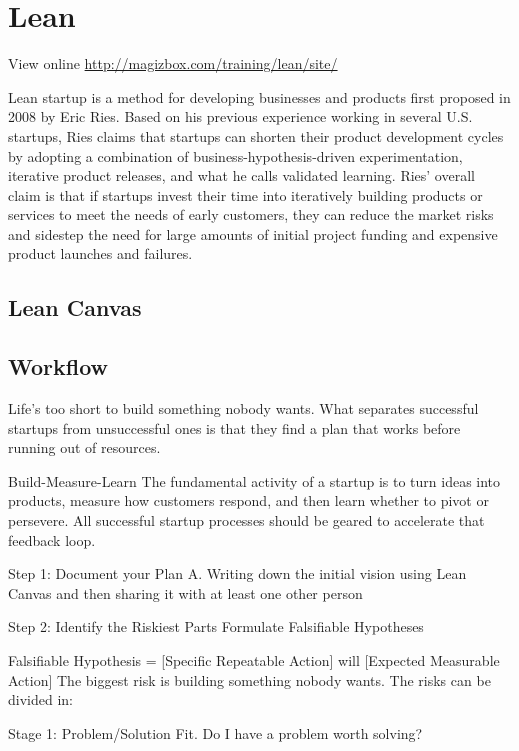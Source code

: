 \chapter{Lean}

View online \href{http://magizbox.com/training/lean/site/}{http://magizbox.com/training/lean/site/}

Lean startup is a method for developing businesses and products first proposed in 2008 by Eric Ries. Based on his previous experience working in several U.S. startups, Ries claims that startups can shorten their product development cycles by adopting a combination of business-hypothesis-driven experimentation, iterative product releases, and what he calls validated learning. Ries' overall claim is that if startups invest their time into iteratively building products or services to meet the needs of early customers, they can reduce the market risks and sidestep the need for large amounts of initial project funding and expensive product launches and failures.

\section{Lean Canvas}

\section{Workflow}

Life’s too short to build something nobody wants. What separates successful startups from unsuccessful ones is that they find a plan that works before running out of resources.

Build-Measure-Learn
The fundamental activity of a startup is to turn ideas into products, measure how customers respond, and then learn whether to pivot or persevere. All successful startup processes should be geared to accelerate that feedback loop.



Step 1: Document your Plan A.
Writing down the initial vision using Lean Canvas and then sharing it with at least one other person

Step 2: Identify the Riskiest Parts
Formulate Falsifiable Hypotheses

Falsifiable Hypothesis = [Specific Repeatable Action] will [Expected Measurable Action]
The biggest risk is building something nobody wants. The risks can be divided in:

Stage 1: Problem/Solution Fit.
Do I have a problem worth solving?

